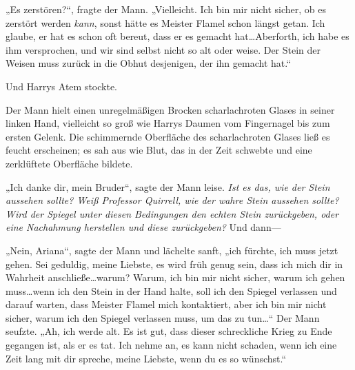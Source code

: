 „Es zerstören?“, fragte der Mann. „Vielleicht. Ich bin mir nicht sicher, ob es zerstört werden \emph{kann}, sonst hätte es Meister Flamel schon längst getan. Ich glaube, er hat es schon oft bereut, dass er es gemacht hat…Aberforth, ich habe es ihm versprochen, und wir sind selbst nicht so alt oder weise. Der Stein der Weisen muss zurück in die Obhut desjenigen, der ihn gemacht hat.“

Und Harrys Atem stockte.

Der Mann hielt einen unregelmäßigen Brocken scharlachroten Glases in seiner linken Hand, vielleicht so groß wie Harrys Daumen vom Fingernagel bis zum ersten Gelenk. Die schimmernde Oberfläche des scharlachroten Glases ließ es feucht erscheinen; es sah aus wie Blut, das in der Zeit schwebte und eine zerklüftete Oberfläche bildete.

„Ich danke dir, mein Bruder“, sagte der Mann leise.
\emph{Ist es das, wie der Stein aussehen sollte? Weiß Professor Quirrell, wie der wahre Stein aussehen sollte? Wird der Spiegel unter diesen Bedingungen den echten Stein zurückgeben, oder eine Nachahmung herstellen und diese zurückgeben?}
Und dann—

„Nein, Ariana“, sagte der Mann und lächelte sanft, „ich fürchte, ich muss jetzt gehen. Sei geduldig, meine Liebste, es wird früh genug sein, dass ich mich dir in Wahrheit anschließe…warum? Warum, ich bin mir nicht sicher, warum ich gehen muss…wenn ich den Stein in der Hand halte, soll ich den Spiegel verlassen und darauf warten, dass Meister Flamel mich kontaktiert, aber ich bin mir nicht sicher, warum ich den Spiegel verlassen muss, um das zu tun…“
Der Mann seufzte.
„Ah, ich werde alt. Es ist gut, dass dieser schreckliche Krieg zu Ende gegangen ist, als er es tat. Ich nehme an, es kann nicht schaden, wenn ich eine Zeit lang mit dir spreche, meine Liebste, wenn du es so wünschst.“

